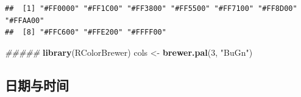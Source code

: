 \documentclass[]{book}
\newenvironment{Shaded}{\begin{snugshade}}{\end{snugshade}}
\newcommand{\CommentTok}[1]{\textcolor[rgb]{0.56,0.35,0.01}{\textit{#1}}}
\newcommand{\DecValTok}[1]{\textcolor[rgb]{0.00,0.00,0.81}{#1}}
\newcommand{\KeywordTok}[1]{\textcolor[rgb]{0.13,0.29,0.53}{\textbf{#1}}}
\newcommand{\NormalTok}[1]{#1}
\newcommand{\StringTok}[1]{\textcolor[rgb]{0.31,0.60,0.02}{#1}}
\begin{document}
\begin{verbatim}
##  [1] "#FF0000" "#FF1C00" "#FF3800" "#FF5500" "#FF7100" "#FF8D00" "#FFAA00"
##  [8] "#FFC600" "#FFE200" "#FFFF00"
\end{verbatim}

\begin{Shaded}
\begin{Highlighting}[]
\CommentTok{#####}
\KeywordTok{library}\NormalTok{(RColorBrewer)}
\NormalTok{cols <-}\StringTok{ }\KeywordTok{brewer.pal}\NormalTok{(}\DecValTok{3}\NormalTok{, }\StringTok{"BuGn"}\NormalTok{)}
\end{Highlighting}
\end{Shaded}

\hypertarget{ux65e5ux671fux4e0eux65f6ux95f4}{%
\subsection{日期与时间}\label{ux65e5ux671fux4e0eux65f6ux95f4}}
\end{document}
